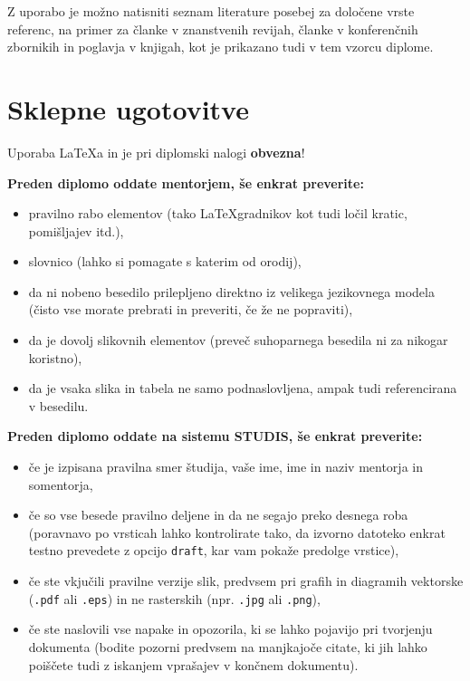 \documentclass[a4paper,12pt,openright]{book}
\begin{document}
Z uporabo  je možno natisniti seznam literature posebej za določene vrste referenc, na primer za članke v znanstvenih revijah, članke v konferenčnih zbornikih in poglavja v knjigah, kot je prikazano tudi v tem vzorcu diplome.

\chapter{Sklepne ugotovitve}

Uporaba \LaTeX{a} in  je pri diplomski nalogi \textbf{obvezna}!


\textbf{Preden diplomo oddate mentorjem, še enkrat preverite:}
\begin{itemize}
    \item pravilno rabo elementov (tako \LaTeX gradnikov kot tudi ločil kratic, pomišljajev itd.),
    \item slovnico (lahko si pomagate s katerim od orodij),
    \item da ni nobeno besedilo prilepljeno direktno iz velikega jezikovnega modela (čisto vse morate prebrati in preveriti, če že ne popraviti),
    \item da je dovolj slikovnih elementov (preveč suhoparnega besedila ni za nikogar koristno),
    \item da je vsaka slika in tabela ne samo podnaslovljena, ampak tudi referencirana v besedilu.
\end{itemize}

\textbf{Preden diplomo oddate na sistemu STUDIS, še enkrat preverite:}
\begin{itemize}
  \item če je izpisana pravilna smer študija, vaše ime, ime in naziv mentorja in somentorja,
  \item če so vse besede pravilno deljene in da ne segajo preko desnega roba (poravnavo po vrsticah lahko kontrolirate tako, da izvorno datoteko enkrat testno prevedete z opcijo \texttt{draft}, kar vam pokaže  predolge vrstice),
  \item če ste vkjučili pravilne verzije slik, predvsem pri grafih in diagramih vektorske ({\tt .pdf} ali {\tt .eps}) in ne rasterskih (npr. {\tt .jpg} ali {\tt .png}),
  \item če ste naslovili vse napake in opozorila, ki se lahko pojavijo pri tvorjenju dokumenta (bodite pozorni predvsem na manjkajoče citate, ki jih lahko poiščete tudi z iskanjem vprašajev v končnem dokumentu).
\end{itemize}



\printbibliography[heading=bibintoc]
\end{document}
